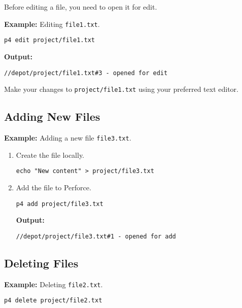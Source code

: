 \documentclass{article}
\begin{document}
Before editing a file, you need to open it for edit.

\textbf{Example:} Editing \texttt{file1.txt}.

\begin{lstlisting}[style=bash]
p4 edit project/file1.txt
\end{lstlisting}

\textbf{Output:}

\begin{verbatim}
//depot/project/file1.txt#3 - opened for edit
\end{verbatim}

Make your changes to \texttt{project/file1.txt} using your preferred text editor.

\subsection{Adding New Files}

\textbf{Example:} Adding a new file \texttt{file3.txt}.

\begin{enumerate}
    \item Create the file locally.

\begin{lstlisting}[style=bash]
echo "New content" > project/file3.txt
\end{lstlisting}

    \item Add the file to Perforce.

\begin{lstlisting}[style=bash]
p4 add project/file3.txt
\end{lstlisting}

    \textbf{Output:}

\begin{verbatim}
//depot/project/file3.txt#1 - opened for add
\end{verbatim}
\end{enumerate}

\subsection{Deleting Files}

\textbf{Example:} Deleting \texttt{file2.txt}.

\begin{lstlisting}[style=bash]
p4 delete project/file2.txt
\end{lstlisting}
\end{document}
